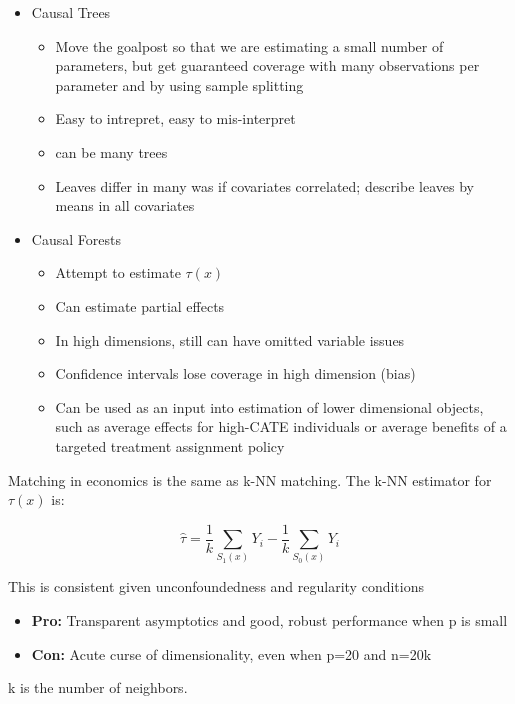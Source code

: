 \documentclass{article}
\begin{document}
\begin{itemize}
    \item Causal Trees
    \begin{itemize}
        \item Move the goalpost so that we are estimating a small number of parameters, but get guaranteed coverage with many observations per parameter and by using sample splitting
        \item Easy to intrepret, easy to mis-interpret
        \item can be many trees
        \item Leaves differ in many was if covariates correlated; describe leaves by means in all covariates
    \end{itemize}
    \item Causal Forests
    \begin{itemize}
        \item Attempt to estimate $\tau(x)$
        \item Can estimate partial effects
        \item In high dimensions, still can have omitted variable issues
        \item Confidence intervals lose coverage in high dimension (bias)
        \item Can be used as an input into estimation of lower dimensional objects, such as average effects for high-CATE individuals or average benefits of a targeted treatment assignment policy
    \end{itemize}
\end{itemize}

Matching in economics is the same as k-NN matching. The k-NN estimator for $\tau(x)$ is:

\begin{equation}
    \hat{\tau} = \frac{1}{k} \sum_{S_1 (x)} Y_i - \frac{1}{k} \sum_{S_0 (x)} Y_i
\end{equation}

This is consistent given unconfoundedness and regularity conditions

\begin{itemize}
    \item \textbf{Pro: } Transparent asymptotics and good, robust performance when p is small
    \item \textbf{Con: } Acute curse of dimensionality, even when p=20 and n=20k
\end{itemize}

k is the number of neighbors.
\end{document}
